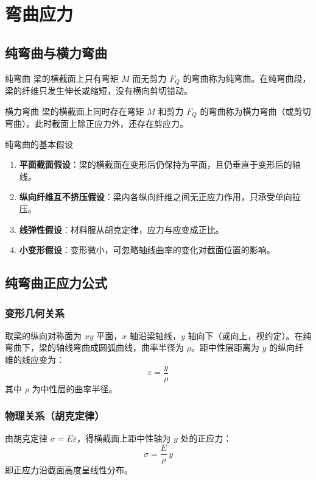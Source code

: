 \chapter{弯曲应力}

\section{纯弯曲与横力弯曲}

\begin{mydefinition}{纯弯曲}
    梁的横截面上只有弯矩 \(M\) 而无剪力 \(F_Q\) 的弯曲称为纯弯曲。在纯弯曲段，梁的纤维只发生伸长或缩短，没有横向剪切错动。
\end{mydefinition}

\begin{mydefinition}{横力弯曲}
    梁的横截面上同时存在弯矩 \(M\) 和剪力 \(F_Q\) 的弯曲称为横力弯曲（或剪切弯曲）。此时截面上除正应力外，还存在剪应力。
\end{mydefinition}

\begin{myhypothesis}{纯弯曲的基本假设}
    \begin{enumerate}
        \item \textbf{平面截面假设}：梁的横截面在变形后仍保持为平面，且仍垂直于变形后的轴线。
        \item \textbf{纵向纤维互不挤压假设}：梁内各纵向纤维之间无正应力作用，只承受单向拉压。
        \item \textbf{线弹性假设}：材料服从胡克定律，应力与应变成正比。
        \item \textbf{小变形假设}：变形微小，可忽略轴线曲率的变化对截面位置的影响。
    \end{enumerate}
\end{myhypothesis}

\section{纯弯曲正应力公式}

\subsection{变形几何关系}
取梁的纵向对称面为 \(xy\) 平面，\(x\) 轴沿梁轴线，\(y\) 轴向下（或向上，视约定）。在纯弯曲下，梁的轴线弯曲成圆弧曲线，曲率半径为 \(\rho\)。距中性层距离为 \(y\) 的纵向纤维的线应变为：
\[
\varepsilon = \frac{y}{\rho}
\]
其中 \(\rho\) 为中性层的曲率半径。

\subsection{物理关系（胡克定律）}
由胡克定律 \(\sigma = E \varepsilon\)，得横截面上距中性轴为 \(y\) 处的正应力：
\[
\sigma = \frac{E}{\rho} \, y
\]
即正应力沿截面高度呈线性分布。

